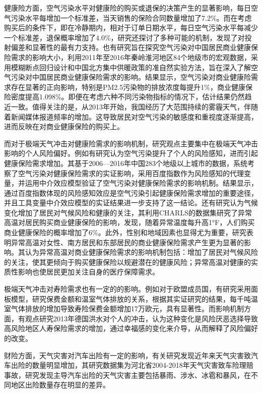 健康险方面，空气污染水平对健康险的购买或退保的决策产生的显著影响\citep{2018Something}，每日空气污染水平每增加一个标准差，当天销售的保险合同数量增加了7.2\%。而在考虑购买后的条件下，即在冷静期内，相对于订单日期水平，每日空气污染水平每减少一个标准差，退保概率增加了4.0\%，研究还探讨了多种可能的机制，发现了对投射偏差和显著性的最有力支持。也有研究旨在探究空气污染对中国居民商业健康保险需求的影响大小\citep{赵强2021空气污染对商业健康保险需求的影响}，利用2011年至2016年秦岭淮河地区84个地级市的宏观数据，采用模糊断点回归设计和中国北方集中供暖政策的准自然实验方法，旨在深入了解空气污染对中国居民商业健康保险需求的影响。结果显示，空气污染对商业健康险需求存在显著的正向影响，特别是PM2.5污染物的排放浓度每提升1\%，商业健康保险密度提高1.098\%。即便在考虑六种不同污染物指标的情况下，估计结果仍然趋近一致。值得关注的是，从2013年开始，我国经历了大范围持续的雾霾天气，伴随着新闻媒体报道频率的增加。这导致居民对空气污染的敏感度和重视度逐渐提高，进而反映在对商业健康保险的购买上。

而对于极端天气冲击对健康险需求的影响机制，研究观点主要集中在极端天气冲击影响的个人风险偏好。例如有研究认为空气污染提升了个人的风险感知，进而引起健康保险需求增加\citep{宋平凡2022空气污染}。其基于2006—2016年中国283个地级以上城市的数据，系统考察了空气污染对健康保险需求的实证影响，采用百度指数作为风险感知的代理变量，并运用中介效应模型验证了空气污染对健康保险需求的影响机制。结果显示，通过百度指数体现的风险感知效应是空气污染引起健康保险需求增加的重要途径，并且工具变量中介效应模型的实证结果进一步支持了这一结论。还有研究认为气候变化增加了居民对气候风险和健康的关注\cite{zhong2022exposure}，其利用CHARLS的数据集研究了异常高温对居民购买商业健康保险的影响，发现，随着异常温度每升高1°F，人们购买商业健康保险的概率增加了6\%。此外，性别和地域因素也显得尤为重要，研究表明异常高温对女性、南方居民和东部居民的商业健康保险需求产生更为显著的影响。其认为异常高温对商业健康保险需求的影响机制包括：增加了居民对气候风险的关注，使其更倾向于购买健康保险以规避潜在的健康风险；异常高温对健康的实质性影响也使居民更加关注自身的医疗保障需求。

极端天气冲击对寿险需求也有一定的的影响。例如对于欧盟成员国，有研究采用面板模型，研究保费金额和温室气体排放的关系\citep{melnychenko2021influence}，根据其实证研究的结果，每千吨温室气体排放的增加导致寿险保费金额增加17万欧元，具有显著性。而影响机制方面，有观点研究2013年德国洪水对个人的冲击\citep{avdeenko2021impact}，认为这种变化是风险厌恶选择导致高风险地区人寿保险需求的增加，通过幸福感的变化来介导，从而解释了风险偏好的改变。

财险方面，天气灾害对汽车出险有一定的影响，有关研究发现近年来天气灾害致汽车出险的数量明显增加\citep{张翠华2020天气灾害致车险理赔的风险分析}，其研究数据集为河北省2004-2018年天气灾害致车险理赔事故，研究发现主导汽车出险的天气灾害主要包括暴雨、涉水、冰雹和暴风，在不同地区出险数量存在明显的差异。

